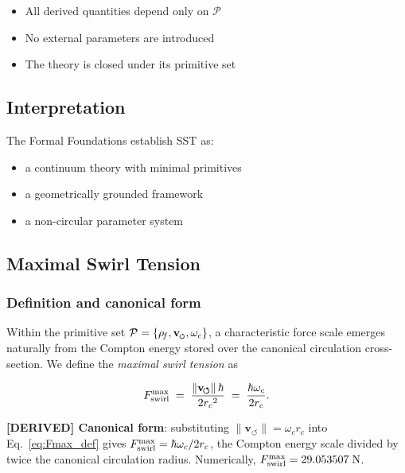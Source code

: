 \documentclass[11pt]{article}
\theoremstyle{definition}
\theoremstyle{plain}
\theoremstyle{remark}
\newcommand{\swirlarrow}{\mathchoice{\mkern-2mu\scriptstyle\boldsymbol{\circlearrowleft}}{\mkern-2mu\scriptstyle\boldsymbol{\circlearrowleft}}{\mkern-2mu\scriptscriptstyle\boldsymbol{\circlearrowleft}}{\mkern-2mu\scriptscriptstyle\boldsymbol{\circlearrowleft}}}
\newcommand{\vswirl}{\mathbf{v}_{\swirlarrow}}
\newcommand{\rhoF}{{\rho_{\!f}}}
\newcommand{\rc}{{r_c}}
\newcommand{\vnorm}{\lVert \mathbf{v}_{\!\boldsymbol{\circlearrowleft}} \rVert}
\begin{document}
        \begin{itemize}
            \item All derived quantities depend only on $\mathcal{P}$
            \item No external parameters are introduced
            \item The theory is closed under its primitive set
        \end{itemize}
    
    \subsection{Interpretation}
        
        The Formal Foundations establish SST as:
        
        \begin{itemize}
            \item a continuum theory with minimal primitives
            \item a geometrically grounded framework
            \item a non-circular parameter system
        \end{itemize}

    \subsection{Maximal Swirl Tension}
    \label{sec:Fmax}

        \subsubsection{Definition and canonical form}

        Within the primitive set $\mathcal{P} = \{\rhoF, \vswirl, \omega_c\}$, a characteristic force scale emerges naturally from the Compton energy stored over the canonical circulation cross-section. We define the \emph{maximal swirl tension} as

        \begin{align}
            F_{\rm swirl}^{\max}
            \;=\; \frac{\vnorm\,\hbar}{2\rc^2}
            \;=\; \frac{\hbar\omega_c}{2\rc}.
            \label{eq:Fmax_def}
        \end{align}

        \textbf{[DERIVED] Canonical form}: substituting $\vnorm = \omega_c \rc$ into Eq.~\eqref{eq:Fmax_def} gives $F_{\rm swirl}^{\max} = \hbar\omega_c/2\rc$, the Compton energy scale divided by twice the canonical circulation radius. Numerically, $F_{\rm swirl}^{\max} = 29.053507\;\text{N}$.
\end{document}
